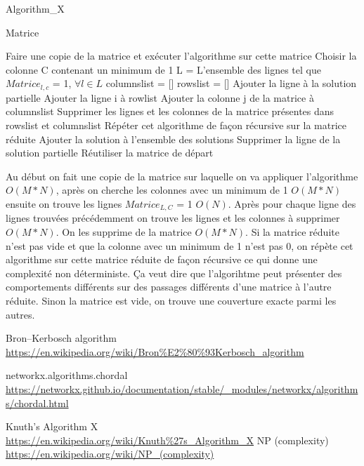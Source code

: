 \documentclass{article}
\begin{document}
		\begin{algorithm}[H]
		\caption{Algorithm\_X}
		\begin{algorithmic}[1]
		\REQUIRE Matrice
		
		\STATE Faire une copie de la matrice et exécuter l'algorithme sur cette matrice		
		\STATE Choisir la colonne C contenant un minimum de 1
		\STATE L = L'ensemble des lignes tel que $Matrice_{l,c}$ = 1, $\forall l \in L$
			\STATE columnslist = [] 
			\STATE rowslist = []
			\STATE Ajouter la ligne à la solution partielle
							\STATE Ajouter la ligne i à rowlist
						\ENDIF									
					\ENDFOR
					\STATE Ajouter la colonne j de la matrice à columnslist	
				\ENDIF
			\ENDFOR
		\STATE Supprimer les lignes et les colonnes de la matrice présentes dans rowslist et columnslist
				\STATE Répéter cet algorithme de façon récursive sur la matrice réduite
			\ENDIF			
		\ELSE
			\STATE Ajouter la solution à l'ensemble des solutions
		\ENDIF 
		\STATE Supprimer la ligne de la solution partielle
		\STATE Réutiliser la matrice de départ
		\ENDFOR
	
		\end{algorithmic}
		\end{algorithm}
		
\cite{Algo3}
Au début on fait une copie de la matrice sur laquelle on va appliquer l'algorithme $O(M*N)$, après on cherche les colonnes avec un minimum de 1 $O(M*N)$ ensuite on trouve les lignes $Matrice_{L,C}$ = 1 $O(N)$. Après pour chaque ligne des lignes trouvées précédemment on trouve les lignes et les colonnes à supprimer $O(M*N)$. On les supprime de la matrice $O(M*N)$. Si la matrice réduite n'est pas vide et que la colonne avec un minimum de 1 n'est pas 0, on répète cet algorithme sur cette matrice réduite de façon récursive ce qui donne une complexité non déterministe. Ça veut dire que l'algorihtme peut présenter des comportements différents sur des passages différents d'une matrice à l'autre réduite. Sinon la matrice est vide, on trouve une couverture exacte parmi les autres.


\begin{thebibliography}{9}

Bron–Kerbosch algorithm
\\\url{https://en.wikipedia.org/wiki/Bron%E2%80%93Kerbosch_algorithm}

networkx.algorithms.chordal
\\\url{https://networkx.github.io/documentation/stable/_modules/networkx/algorithms/chordal.html}

Knuth's Algorithm X
\\\url{https://en.wikipedia.org/wiki/Knuth%27s_Algorithm_X}
NP (complexity)
\\\url{https://en.wikipedia.org/wiki/NP_(complexity)}

\end{thebibliography}
		
\end{document}
